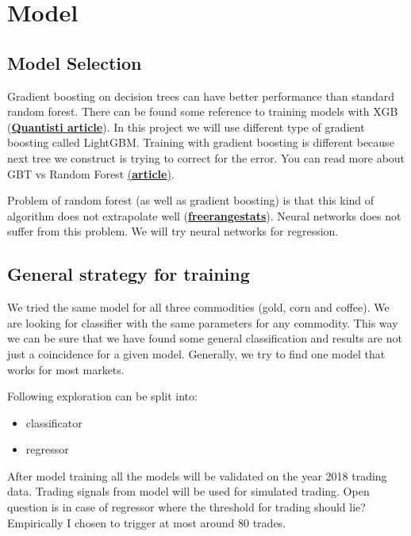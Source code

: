 \documentclass[final,2p]{elsarticle}
\begin{document}
\clearpage

\section{Model}

\subsection{Model Selection}
Gradient boosting on decision trees can have better performance than standard random forest.
There can be found some reference to training models with XGB (\href{https://www.quantinsti.com/blog/forecasting-markets-using-extreme-gradient-boosting-xgboost}{\textbf{Quantisti article}}).
In this project we will use different type of gradient boosting called LightGBM.
Training with gradient boosting is different because next tree we construct is trying to correct for the error.
You can read more about GBT vs Random Forest \href{https://medium.com/@aravanshad/gradient-boosting-versus-random-forest-cfa3fa8f0d80}{(\textbf{article})}.

Problem of random forest (as well as gradient boosting) is that this kind of algorithm does not extrapolate well (\href{http://freerangestats.info/blog/2016/12/10/extrapolation}{\textbf{freerangestats}}).
Neural networks does not suffer from this problem. We will try neural networks for regression.

\subsection{General strategy for training}
We tried the same model for all three commodities (gold, corn and coffee). We are looking for classifier with the same parameters for any commodity. This way we can be sure that we have found some general classification and results are not just a coincidence for a given model.
Generally, we try to find one model that works for most markets.

Following exploration can be split into:

\begin{itemize}
    \item classificator
    \item regressor
\end{itemize}

After model training all the models will be validated on the year 2018 trading data. Trading signals from model will be used for simulated trading. Open question is in case of regressor where the threshold for trading should lie?
Empirically I chosen to trigger at most around $80$ trades.
\end{document}
